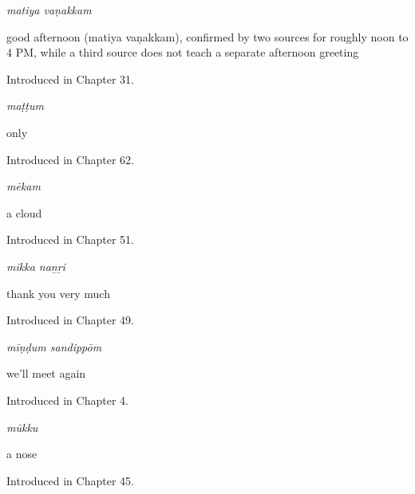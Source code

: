 \noindent\begin{minipage}[t]{\linewidth}
\raggedright
\textbf{ }\enspace\emph{matiya vaṇakkam}\par
\small good afternoon (matiya vaṇakkam), confirmed by two sources for roughly noon to 4 PM, while a third source does not teach a separate afternoon greeting\par
\footnotesize Introduced in Chapter 31.
\end{minipage}\par\medskip

\noindent\begin{minipage}[t]{\linewidth}
\raggedright
\textbf{}\enspace\emph{maṭṭum}\par
\small only\par
\footnotesize Introduced in Chapter 62.
\end{minipage}\par\medskip

\noindent\begin{minipage}[t]{\linewidth}
\raggedright
\textbf{}\enspace\emph{mēkam}\par
\small a cloud\par
\footnotesize Introduced in Chapter 51.
\end{minipage}\par\medskip

\noindent\begin{minipage}[t]{\linewidth}
\raggedright
\textbf{ }\enspace\emph{mikka naṉṟi}\par
\small thank you very much\par
\footnotesize Introduced in Chapter 49.
\end{minipage}\par\medskip

\noindent\begin{minipage}[t]{\linewidth}
\raggedright
\textbf{ }\enspace\emph{mīṇḍum sandippōm}\par
\small we'll meet again\par
\footnotesize Introduced in Chapter 4.
\end{minipage}\par\medskip

\noindent\begin{minipage}[t]{\linewidth}
\raggedright
\textbf{}\enspace\emph{mūkku}\par
\small a nose\par
\footnotesize Introduced in Chapter 45.
\end{minipage}\par\medskip


